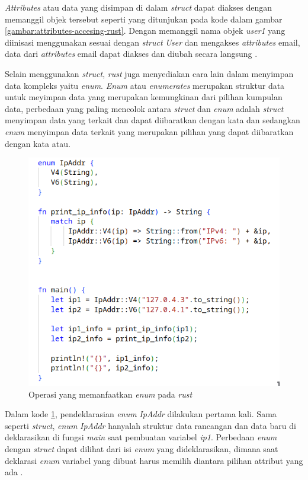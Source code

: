 \emph{Attributes} atau data yang disimpan di dalam \emph{struct} dapat diakses dengan memanggil objek tersebut seperti yang ditunjukan pada kode dalam gambar \ref{gambar:attributes-accesing-rust}. Dengan memanggil nama objek \emph{user1} yang diinisasi menggunakan sesuai dengan \emph{struct} \emph{User} dan mengakses \emph{attributes} email, data dari \emph{attributes} email dapat diakses dan diubah secara langsung \citep{rustbook}.

Selain menggunakan \emph{struct}, \emph{rust} juga menyediakan cara lain dalam menyimpan data kompleks yaitu \emph{enum}. \emph{Enum} atau \emph{enumerates} merupakan struktur data untuk meyimpan data yang merupakan kemungkinan dari pilihan kumpulan data, perbedaan yang paling mencolok antara \emph{struct} dan \emph{enum} adalah \emph{struct} menyimpan data yang terkait dan dapat diibaratkan dengan kata dan sedangkan \emph{enum} menyimpan data terkait yang merupakan pilihan yang dapat diibaratkan dengan kata atau.\citep{rustbook}

\begin{figure}[H]
  \centering
  \includegraphics[keepaspectratio, width=12cm]{gambar/rust-enum-operations.png}
  \caption{Operasi yang memanfaatkan \emph{enum} pada \emph{rust} \citep{rustbook}}
  \label{gambar:enum-operations-rust}
\end{figure}

Dalam kode \ref{gambar:enum-operations-rust}, pendeklarasian \emph{enum} \emph{IpAddr} dilakukan pertama kali. Sama seperti \emph{struct}, \emph{enum} \emph{IpAddr} hanyalah struktur data rancangan dan data baru di deklarasikan di fungsi \emph{main} saat pembuatan variabel \emph{ip1}. Perbedaan \emph{enum} dengan \emph{struct} dapat dilihat dari isi \emph{enum} yang dideklarasikan, dimana saat deklarasi \emph{enum} variabel yang dibuat harus memilih diantara pilihan attribut yang ada \citep{rustbook}.

